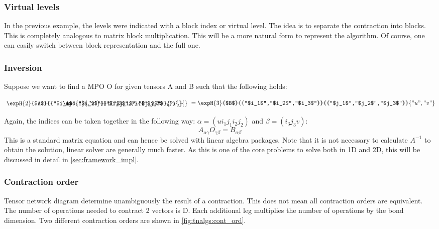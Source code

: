\subsubsection{Virtual levels}
In the previous example, the levels were indicated with a block index or virtual level. The idea is to separate the contraction into blocks. This is completely analogous to matrix block multiplication. This will be a more natural form to represent the algorithm. Of course, one can easily switch between block representation and the full one.

\subsubsection{Inversion}
Suppose we want to find a MPO O for given tensors A and B such that the following holds:

\def \figone {\expH{2}{$A$}{{"$i_1$","$i_2$"}}{{"$j_1$","$j_2$"}}{{"u",}}}
\def \figthree {\expH{3}{$B$}{{"$i_1$","$i_2$","$i_3$"}}{{"$j_1$","$j_2$","$j_3$"}}{{"u","v"}}}

\def \figtwo {\mpo{1}{{,"v"}}{{"$i_3$",}}{{"$j_3$",}}{}{}}

\begin{equation}
    \combineTikz{ \figone }{\figtwo}{1.8} =  \figthree
\end{equation}

Again, the indices can be taken together in the following way: $\alpha = (u i_1 j_1  i_2 j_2)$ and $\beta = (i_3 j_3 v)$:
\begin{equation}
    A_{\alpha \gamma} O_{\gamma \beta} = B_{\alpha \beta}
\end{equation}
This is a standard matrix equation and can hence be solved with linear algebra packages. Note that it is not necessary to calculate $A^{-1}$ to obtain the solution, linear solver are generally much faster. As this is one of the core problems to solve both in 1D and 2D, this will be discussed in detail in \cref{sec:framework_impl}.

\subsubsection{Contraction order}

Tensor network diagram determine unambiguously the result of a contraction. This does not mean all contraction orders are equivalent. The number of operations needed to contract 2 vectors is D. Each additional leg multiplies the number of operations by the bond dimension. Two different contraction orders are shown in \cref{fig:tnalgs:cont_ord}.


